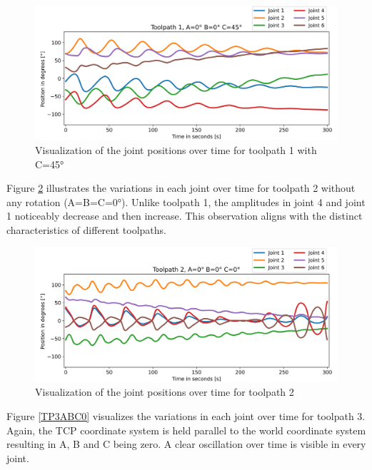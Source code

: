 \begin{figure}[H]
	\centerline{\includegraphics[width=1\textwidth]{figures/TP1ABC45.png}}
	\caption{Visualization of the joint positions over time for toolpath 1 with C=45°}
	\label{TP1ABC45}
\end{figure}



Figure \ref{TP2ABC0} illustrates the variations in each joint over time for toolpath 2 without any rotation (A=B=C=0°). Unlike toolpath 1, the amplitudes in joint 4 and joint 1 noticeably decrease and then increase. This observation aligns with the distinct characteristics of different toolpaths.
 
\begin{figure}[H]
	\centerline{\includegraphics[width=1\textwidth]{figures/TP2ABC0.png}}
	\caption{Visualization of the joint positions over time for toolpath 2}
	\label{TP2ABC0}
\end{figure}

Figure \ref{TP3ABC0} visualizes the variations in each joint over time for toolpath 3. Again, the \acrshort{TCP} coordinate system is held parallel to the world coordinate system resulting in A, B and C being zero. A clear oscillation over time is visible in every joint.\newpage

